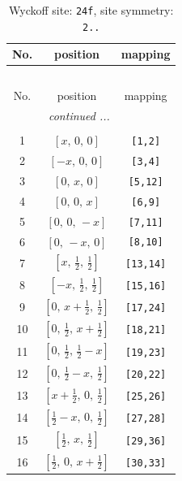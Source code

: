 \documentclass[fleqn,8pt]{jsarticle}
\begin{document}
\renewcommand{\arraystretch}{1.2}
\begin{longtable}{ccc}
\caption{Wyckoff site: {\tt 24f}, site symmetry: {\tt 2..}}
 \\
 \hline \hline
No. & position & mapping \\ \hline \endfirsthead

\multicolumn{2}{l}{\tablename\ \thetable{}} \\
 \hline \hline
No. & position & mapping \\ \hline \endhead

 \hline \hline
\multicolumn{2}{r}{\footnotesize\it continued ...} \\ \endfoot

 \hline \hline
\multicolumn{2}{r}{} \\ \endlastfoot

1 & $\left[ x,\, 0,\, 0 \right]$ & {\tt [1,2]} \\ \hline
2 & $\left[ - x,\, 0,\, 0 \right]$ & {\tt [3,4]} \\ \hline
3 & $\left[ 0,\, x,\, 0 \right]$ & {\tt [5,12]} \\ \hline
4 & $\left[ 0,\, 0,\, x \right]$ & {\tt [6,9]} \\ \hline
5 & $\left[ 0,\, 0,\, - x \right]$ & {\tt [7,11]} \\ \hline
6 & $\left[ 0,\, - x,\, 0 \right]$ & {\tt [8,10]} \\ \hline
7 & $\left[ x,\, \frac{1}{2},\, \frac{1}{2} \right]$ & {\tt [13,14]} \\ \hline
8 & $\left[ - x,\, \frac{1}{2},\, \frac{1}{2} \right]$ & {\tt [15,16]} \\ \hline
9 & $\left[ 0,\, x + \frac{1}{2},\, \frac{1}{2} \right]$ & {\tt [17,24]} \\ \hline
10 & $\left[ 0,\, \frac{1}{2},\, x + \frac{1}{2} \right]$ & {\tt [18,21]} \\ \hline
11 & $\left[ 0,\, \frac{1}{2},\, \frac{1}{2} - x \right]$ & {\tt [19,23]} \\ \hline
12 & $\left[ 0,\, \frac{1}{2} - x,\, \frac{1}{2} \right]$ & {\tt [20,22]} \\ \hline
13 & $\left[ x + \frac{1}{2},\, 0,\, \frac{1}{2} \right]$ & {\tt [25,26]} \\ \hline
14 & $\left[ \frac{1}{2} - x,\, 0,\, \frac{1}{2} \right]$ & {\tt [27,28]} \\ \hline
15 & $\left[ \frac{1}{2},\, x,\, \frac{1}{2} \right]$ & {\tt [29,36]} \\ \hline
16 & $\left[ \frac{1}{2},\, 0,\, x + \frac{1}{2} \right]$ & {\tt [30,33]} \\ \hline

\end{longtable}
\end{document}
